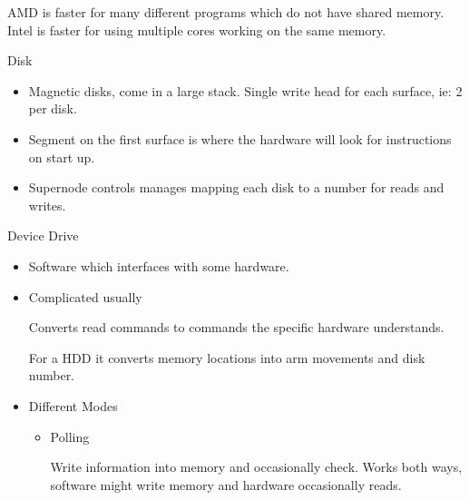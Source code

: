\documentclass{report}
\begin{document}
\begin{description}
\begin{itemize}
\begin{mdframed}
                    AMD is faster for many different programs which do not have
                    shared memory. Intel is faster for using multiple cores working
                    on the same memory.
                \end{mdframed}
        \end{itemize}
    \item Disk
        \begin{itemize}
            \item Magnetic disks, come in a large stack. Single write head for each
                surface, ie: 2 per disk.
            \item Segment on the first surface is where the hardware will look for
                instructions on start up.
            \item Supernode controls manages mapping each disk to a number for
                reads and writes.
        \end{itemize}
    \item Device Drive
        \begin{itemize}
            \item Software which interfaces with some hardware.
            \item Complicated usually
                \begin{mdframed}
                    Converts read commands to commands the specific hardware understands.

                    For a HDD it converts memory locations into arm movements and disk
                    number.
                \end{mdframed}
            \item Different Modes
                \begin{itemize}
                    \item Polling
                        \begin{mdframed}
                            Write information into memory and occasionally check.
                            Works both ways, software might write memory and
                            hardware occasionally reads.


\end{mdframed}
\end{itemize}
\end{itemize}
\end{description}
\end{document}
